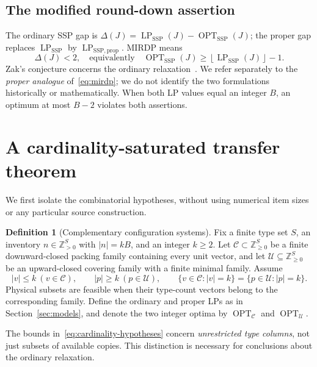 \documentclass[11pt,a4paper]{article}
\theoremstyle{definition}
\newtheorem{definition}[theorem]{Definition}
\theoremstyle{remark}
\newcommand{\Z}{\mathbb Z}
\newcommand{\SSP}{\mathrm{SSP}}
\newcommand{\OPT}{\operatorname{OPT}}
\newcommand{\LP}{\operatorname{LP}}
\newcommand{\floor}[1]{\left\lfloor #1\right\rfloor}
\newcommand{\cC}{\mathcal C}
\newcommand{\cU}{\mathcal U}
\begin{document}
\subsection{The modified round-down assertion}
The ordinary SSP gap is $\Delta(J)=\LP_{\SSP}(J)-\OPT_{\SSP}(J)$; the proper gap replaces $\LP_{\SSP}$ by $\LP_{\SSP,\mathrm{prop}}$. MIRDP means
\begin{equation}\label{eq:mirdp}
 \Delta(J)<2,
 \quad\text{equivalently}\quad
 \OPT_{\SSP}(J)\ge\floor{\LP_{\SSP}(J)}-1.
\end{equation}
Zak's conjecture concerns the ordinary relaxation~\cite{Zak03,MS16a}. We refer separately to the \emph{proper analogue} of~\eqref{eq:mirdp}; we do not identify the two formulations historically or mathematically. When both LP values equal an integer $B$, an optimum at most $B-2$ violates both assertions.

\section{A cardinality-saturated transfer theorem}\label{sec:transfer}
We first isolate the combinatorial hypotheses, without using numerical item sizes or any particular source construction.

\begin{definition}[Complementary configuration systems]\label{def:systems}
Fix a finite type set $S$, an inventory $n\in\Z_{>0}^{S}$ with $|n|=kB$, and an integer $k\ge2$. Let $\cC\subset\Z_{\ge0}^{S}$ be a finite downward-closed packing family containing every unit vector, and let $\cU\subseteq\Z_{\ge0}^{S}$ be an upward-closed covering family with a finite minimal family. Assume
\begin{equation}\label{eq:cardinality-hypotheses}
 |v|\le k\ (v\in\cC),\qquad |p|\ge k\ (p\in\cU),
 \qquad
 \{v\in\cC:|v|=k\}=\{p\in\cU:|p|=k\}.
\end{equation}
Physical subsets are feasible when their type-count vectors belong to the corresponding family. Define the ordinary and proper LPs as in Section~\ref{sec:models}, and denote the two integer optima by $\OPT_{\cC}$ and $\OPT_{\cU}$.
\end{definition}
The bounds in~\eqref{eq:cardinality-hypotheses} concern \emph{unrestricted type columns}, not just subsets of available copies. This distinction is necessary for conclusions about the ordinary relaxation.
\end{document}
